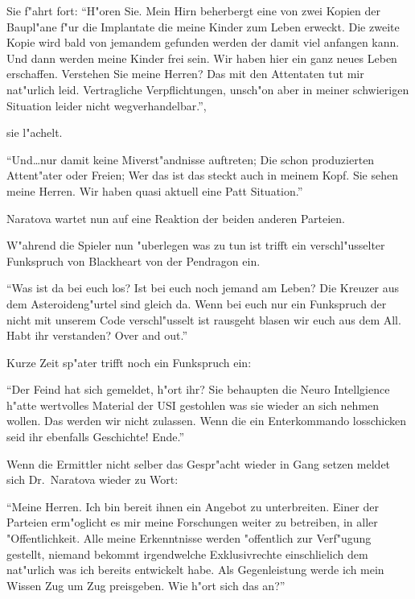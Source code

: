 Sie f"ahrt fort: "`H"oren Sie. Mein Hirn beherbergt eine von zwei Kopien der Baupl"ane f"ur die Implantate die meine Kinder zum Leben erweckt. Die zweite Kopie wird bald von jemandem gefunden werden der damit viel anfangen kann. Und dann werden meine Kinder frei sein. Wir haben hier ein ganz neues Leben erschaffen. Verstehen Sie meine Herren? Das mit den Attentaten tut mir nat"urlich leid. Vertragliche Verpflichtungen, unsch"on aber in meiner schwierigen Situation leider nicht wegverhandelbar."',

sie l"achelt.

"`Und\dots{}nur damit keine Mi\3verst"andnisse auftreten; Die schon produzierten Attent"ater oder Freien; Wer das ist das steckt auch in meinem Kopf. Sie sehen meine Herren. Wir haben quasi aktuell eine Patt Situation."'

Naratova wartet nun auf eine Reaktion der beiden anderen Parteien.

W"ahrend die Spieler nun "uberlegen was zu tun ist trifft ein verschl"usselter Funkspruch von Blackheart von der Pendragon ein.

"`Was ist da bei euch los? Ist bei euch noch jemand am Leben? Die Kreuzer aus dem Asteroideng"urtel sind gleich da. Wenn bei euch nur ein Funkspruch der nicht mit unserem Code verschl"usselt ist rausgeht blasen wir euch aus dem All. Habt ihr verstanden? Over and out."'

Kurze Zeit sp"ater trifft noch ein Funkspruch ein:

"`Der Feind hat sich gemeldet, h"ort ihr? Sie behaupten die Neuro Intellgience h"atte wertvolles Material der USI gestohlen was sie wieder an sich nehmen wollen. Das werden wir nicht zulassen. Wenn die ein Enterkommando losschicken seid ihr ebenfalls Geschichte! Ende."'

Wenn die Ermittler nicht selber das Gespr"acht wieder in Gang setzen meldet sich Dr.~Naratova wieder zu Wort:

"`Meine Herren. Ich bin bereit ihnen ein Angebot zu unterbreiten. Einer der Parteien erm"oglicht es mir meine Forschungen weiter zu betreiben, in aller "Offentlichkeit. Alle meine Erkenntnisse werden "offentlich zur Verf"ugung gestellt, niemand bekommt irgendwelche Exklusivrechte einschlie\3lich dem nat"urlich was ich bereits entwickelt habe. Als Gegenleistung werde ich mein Wissen Zug um Zug preisgeben. Wie h"ort sich das an?"'

